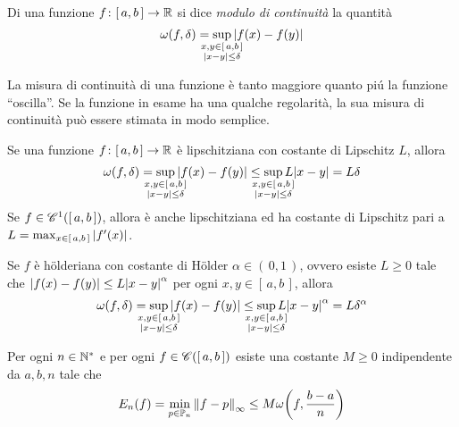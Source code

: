  	\begin{definizione}
 		Di una funzione \(f \colon [\, a, b \,] \to \mathbb{R}\) si dice \emph{modulo di continuità} la quantità
		\begin{equation}\label{eq:modulo-contin}
 			\omega (f, \delta) = \sup_{\mathclap{\substack{x, y \in [\, a, b \,] \\ \abs{x - y} \le \delta}}} \abs{f (x) - f (y)}
 		\end{equation}
	\end{definizione}

	La misura di continuità di una funzione è tanto maggiore quanto piú la funzione “oscilla”. Se la funzione in esame ha una qualche regolarità, la sua misura di continuità può essere stimata in modo semplice.
	
	\begin{esempio}
		Se una funzione \(f \colon [\, a, b \,] \to \mathbb{R}\) è lipschitziana con costante di Lipschitz \(L\), allora
		\begin{equation*}
			\omega (f, \delta) = \sup_{\mathclap{\substack{x, y \in [\, a, b \,] \\ \abs{x - y} \le \delta}}} \abs{f (x) - f (y)} \le \sup_{\mathclap{\substack{x, y \in [\, a, b \,] \\ \abs{x - y} \le \delta}}} L \abs{x - y} = L \delta
		\end{equation*}
		Se \(f \in \mathscr{C}^1 ([\, a, b\,])\), allora è anche lipschitziana ed ha costante di Lipschitz pari a \(L = \max_{x \in [\, a, b \,]} \abs{f' (x)}\).
		
		Se \(f\) è h\"olderiana con costante di H\"older \(\alpha \in (\, 0, 1 \,)\), ovvero esiste \(L \ge 0\) tale che \(\abs{f (x) - f (y)} \le L \abs{x - y}^\alpha\) per ogni \(x, y \in [\, a, b \,]\), allora
		\begin{equation*}
			\omega (f, \delta) = \sup_{\mathclap{\substack{x, y \in [\, a, b \,] \\ \abs{x - y} \le \delta}}} \abs{f (x) - f (y)} \le \sup_{\mathclap{\substack{x, y \in [\, a, b \,] \\ \abs{x - y} \le \delta}}} L \abs{x - y}^\alpha = L \delta^\alpha
		\end{equation*}
	\end{esempio}

	\begin{teorema}[Jackson]\label{th:jackson}
		Per ogni \(n \in \mathbb{N}^*\) e per ogni \(f \in \mathscr{C} ([\, a, b \,])\) esiste una costante \(M \ge 0\) indipendente da \(a, b, n\) tale che
		\begin{equation}\label{eq:jackson}
			E_n (f) = \min_{p \in \mathbb{P}_n} \norm{f - p}_\infty \le M \omega \qty(f, \frac{b - a}{n})
		\end{equation}
	\end{teorema}

